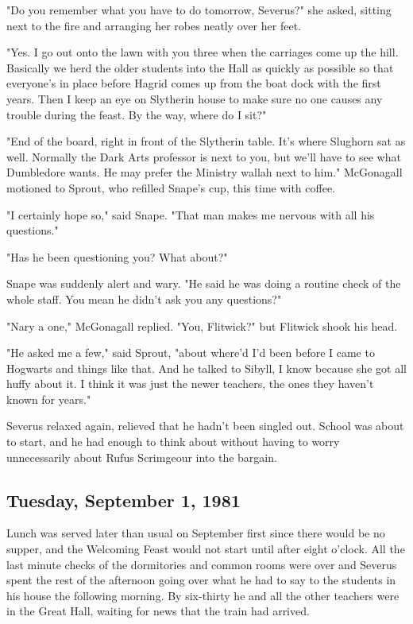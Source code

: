"Do you remember what you have to do tomorrow, Severus?" she asked, sitting next to the fire and arranging her robes neatly over her feet.

"Yes. I go out onto the lawn with you three when the carriages come up the hill. Basically we herd the older students into the Hall as quickly as possible so that everyone's in place before Hagrid comes up from the boat dock with the first years. Then I keep an eye on Slytherin house to make sure no one causes any trouble during the feast. By the way, where do I sit?"

"End of the board, right in front of the Slytherin table. It's where Slughorn sat as well. Normally the Dark Arts professor is next to you, but we'll have to see what Dumbledore wants. He may prefer the Ministry wallah next to him." McGonagall motioned to Sprout, who refilled Snape's cup, this time with coffee.

"I certainly hope so," said Snape. "That man makes me nervous with all his questions."

"Has he been questioning you? What about?"

Snape was suddenly alert and wary. "He said he was doing a routine check of the whole staff. You mean he didn't ask you any questions?"

"Nary a one," McGonagall replied. "You, Flitwick?" but Flitwick shook his head.

"He asked me a few," said Sprout, "about where'd I'd been before I came to Hogwarts and things like that. And he talked to Sibyll, I know because she got all huffy about it. I think it was just the newer teachers, the ones they haven't known for years."

Severus relaxed again, relieved that he hadn't been singled out. School was about to start, and he had enough to think about without having to worry unnecessarily about Rufus Scrimgeour into the bargain.

\subsection{Tuesday, September 1, 1981}

Lunch was served later than usual on September first since there would be no supper, and the Welcoming Feast would not start until after eight o'clock. All the last minute checks of the dormitories and common rooms were over and Severus spent the rest of the afternoon going over what he had to say to the students in his house the following morning. By six-thirty he and all the other teachers were in the Great Hall, waiting for news that the train had arrived.

